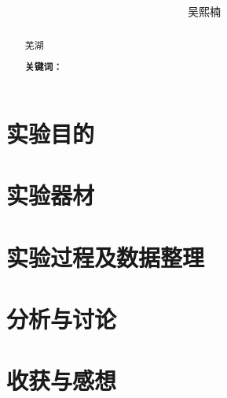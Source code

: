 \documentclass[UTF8]{ctexart}
\author{
	吴熙楠}
\title{
	\heiti{普物实验报告}
}
\begin{document}
	\maketitle

	\renewcommand{\contentsname}{目录} %
	\tableofcontents
	\newpage
		\renewcommand{\abstractname}{\large 摘要\\}
	\begin{abstract}
		 芜湖
			
	\textbf{关键词：}
	\end{abstract}
\section{实验目的}
\section{实验器材}
\section{实验过程及数据整理}
\section{分析与讨论}
\section{收获与感想}
\end{document}
